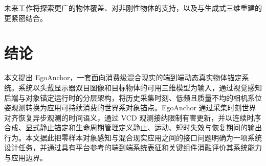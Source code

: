 \documentclass[9pt,twocolumn,letterpaper]{extarticle}
\begin{document}
未来工作将探索更广的物体覆盖、对非刚性物体的支持，以及与生成式三维重建的更紧密结合。

\section{结论}\label{sec:conclusion}

本文提出 EgoAnchor，一套面向消费级混合现实的端到端动态真实物体锚定系统。系统以头戴显示器双目图像和目标物体的可用三维模型为输入，通过视觉感知后端与对象锚定运行时的分层架构，将历史采集时刻、低频且质量不均的相机系位姿观测转换为应用可持续消费的世界系对象锚点。EgoAnchor 通过采集时刻世界对齐恢复异步观测的时间语义，通过 VCD 观测接纳限制有害更新，并以连续时序合成、显式静止锚定和生命周期管理定义静止、运动、短时失效与恢复期间的输出行为。本文据此把零样本对象感知与混合现实应用之间的接口问题明确为一项系统设计任务，并通过具有平台参考的端到端系统表征和关键组件消融评价其系统能力与应用边界。




\end{document}
